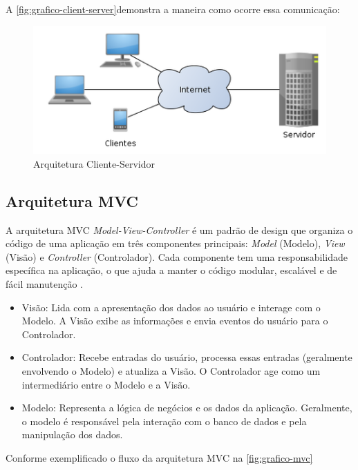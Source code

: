 A \autoref{fig:grafico-client-server}demonstra a maneira como ocorre essa comunicação:

\begin{figure}[htb]
    \caption{\label{fig:grafico-client-server}Arquitetura Cliente-Servidor}
    \begin{center}
        \includegraphics[scale=0.9]{imagens/arquitetura-cliente-servidor.png}
    \end{center}
\end{figure}


\subsection{Arquitetura MVC}
A arquitetura MVC \textit{Model-View-Controller} é um padrão de design que organiza o código de uma aplicação em três componentes principais: \textit{Model} (Modelo), \textit{View} (Visão) e \textit{Controller} (Controlador). Cada componente tem uma responsabilidade específica na aplicação, o que ajuda a manter o código modular, escalável e de fácil manutenção \cite{engsoftmoderna}.

\begin{itemize}
    \item Visão: Lida com a apresentação dos dados ao usuário e interage com o Modelo. A Visão exibe as informações e envia eventos do usuário para o Controlador.
    \item Controlador: Recebe entradas do usuário, processa essas entradas (geralmente envolvendo o Modelo) e atualiza a Visão. O Controlador age como um intermediário entre o Modelo e a Visão.
    \item Modelo: Representa a lógica de negócios e os dados da aplicação. Geralmente, o modelo é responsável pela interação com o banco de dados e pela manipulação dos dados.
\end{itemize}
Conforme exemplificado o fluxo da arquitetura MVC na \autoref{fig:grafico-mvc}

